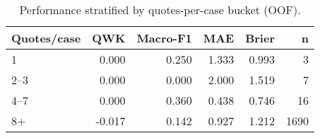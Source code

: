 \begin{table}
\caption{Performance stratified by quotes-per-case bucket (OOF).}
\label{tab:robustness-qpc}
\begin{tabular}{lrrrrr}
\toprule
Quotes/case & QWK & Macro-F1 & MAE & Brier & n \\
\midrule
1 & 0.000 & 0.250 & 1.333 & 0.993 & 3 \\
2–3 & 0.000 & 0.000 & 2.000 & 1.519 & 7 \\
4–7 & 0.000 & 0.360 & 0.438 & 0.746 & 16 \\
8+ & -0.017 & 0.142 & 0.927 & 1.212 & 1690 \\
\bottomrule
\end{tabular}
\end{table}
